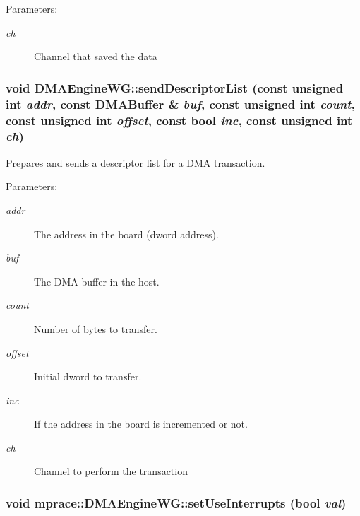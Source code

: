 \begin{Desc}
\item[Parameters:]
\begin{description}
\item[{\em ch}]Channel that saved the data\end{description}
\end{Desc}
\hypertarget{classmprace_1_1DMAEngineWG_b5}{
\subsubsection[sendDescriptorList]{\setlength{\rightskip}{0pt plus 5cm}void DMAEngine\-WG::send\-Descriptor\-List (const unsigned int {\em addr}, const \hyperlink{classmprace_1_1DMABuffer}{DMABuffer} \& {\em buf}, const unsigned int {\em count}, const unsigned int {\em offset}, const bool {\em inc}, const unsigned int {\em ch})}}
\label{classmprace_1_1DMAEngineWG_b5}


Prepares and sends a descriptor list for a DMA transaction. 

\begin{Desc}
\item[Parameters:]
\begin{description}
\item[{\em addr}]The address in the board (dword address). \item[{\em buf}]The DMA buffer in the host. \item[{\em count}]Number of bytes to transfer. \item[{\em offset}]Initial dword to transfer. \item[{\em inc}]If the address in the board is incremented or not. \item[{\em ch}]Channel to perform the transaction\end{description}
\end{Desc}
\hypertarget{classmprace_1_1DMAEngineWG_a8}{
\subsubsection[setUseInterrupts]{\setlength{\rightskip}{0pt plus 5cm}void mprace::DMAEngine\-WG::set\-Use\-Interrupts (bool {\em val})}}
\label{classmprace_1_1DMAEngineWG_a8}


